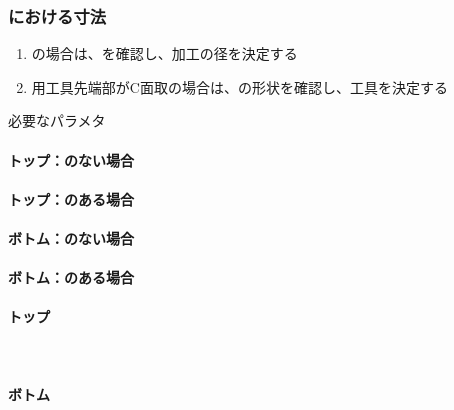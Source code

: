 \subsubsection{\EndFaceChamferMilling における寸法}
\begin{enumerate}[label=\sarrow]
\item \EndFaceOutCChamfer の場合は、\OutcutExists を確認し、加工の径を決定する
\item {}\nameOutcut 用工具先端部がC面取の場合は、\nameOutcut の形状を確認し、工具を決定する
\end{enumerate}
\begin{Parameter}{必要なパラメタ}
\paragraph*{トップ\EndFaceOutCChamfer：\Outcut のない場合}
\PMACOD
\PMBDOD
\PMTopEndFaceOutCChamferLength
\PMODCornerR
\tcbline*
\paragraph*{トップ\EndFaceOutCChamfer：\Outcut のある場合}
\PMTopOutcutACwidth
\PMTopOutcutBDwidth
\PMTopOutcutCornerR
\PMTopEndFaceOutCChamferLength
\tcbline*
\paragraph*{ボトム\EndFaceOutCChamfer：\Outcut のない場合}
\PMACOD
\PMBDOD
\PMBottomEndFaceOutCChamferLength
\PMODCornerR
\tcbline*
\paragraph*{ボトム\EndFaceOutCChamfer：\Outcut のある場合}
\PMBottomOutcutACwidth
\PMBottomOutcutBDwidth
\PMBottomOutcutConerR
\PMBottomEndFaceOutCChamferLength
\tcbline*
\paragraph*{トップ\EndFaceInCChamfer}
\PMTopEndACID
\PMTopEndBDID
\PMTopEndIDCornerR\\
\PMTopEndFaceInCChamferLength
\PMPlatingThk
\tcbline*
\paragraph*{ボトム\EndFaceInCChamfer}
\PMBottomEndACID
\PMBottomEndBDID
\PMBottomEndIDCornerR\\
\PMBottomEndFaceInCChamferLength
\PMPlatingThk
\end{Parameter}

